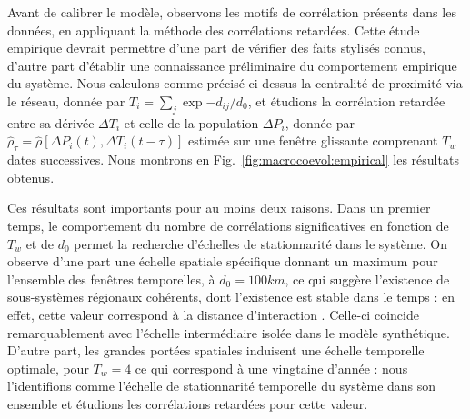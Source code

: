 Avant de calibrer le modèle, observons les motifs de corrélation présents dans les données, en appliquant la méthode des corrélations retardées. Cette étude empirique devrait permettre d'une part de vérifier des faits stylisés connus, d'autre part d'établir une connaissance préliminaire du comportement empirique du système. Nous calculons comme précisé ci-dessus la centralité de proximité via le réseau, donnée par $T_i = \sum_j \exp{-d_{ij}/d_0}$, et étudions la corrélation retardée entre sa dérivée $\Delta T_i$ et celle de la population $\Delta P_i$, donnée par $\hat{\rho}_{\tau} = \hat{\rho}\left[\Delta P_i(t),\Delta T_i(t-\tau)\right]$ estimée sur une fenêtre glissante comprenant $T_w$ dates successives. Nous montrons en Fig.~\ref{fig:macrocoevol:empirical} les résultats obtenus.


Ces résultats sont importants pour au moins deux raisons. Dans un premier temps, le comportement du nombre de corrélations significatives en fonction de $T_w$ et de $d_0$ permet la recherche d'échelles de stationnarité dans le système. On observe d'une part une échelle spatiale spécifique donnant un maximum pour l'ensemble des fenêtres temporelles, à $d_0 = 100km$, ce qui suggère l'existence de sous-systèmes régionaux cohérents, dont l'existence est stable dans le temps : en effet, cette valeur correspond à la distance d'interaction . Celle-ci coincide remarquablement avec l'échelle intermédiaire isolée dans le modèle synthétique. D'autre part, les grandes portées spatiales induisent une échelle temporelle optimale, pour $T_w = 4$ ce qui correspond à une vingtaine d'année : nous l'identifions comme l'échelle de stationnarité temporelle du système dans son ensemble et étudions les corrélations retardées pour cette valeur.


